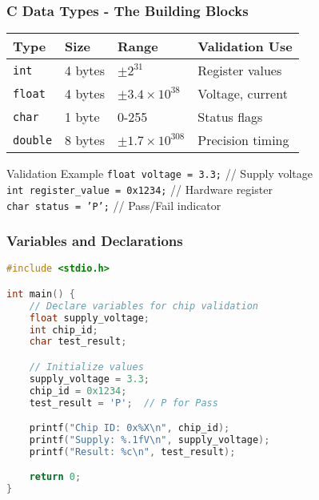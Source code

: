 \documentclass{beamer}
\begin{document}
\begin{frame}
\frametitle{C Data Types - The Building Blocks}
\begin{center}
\begin{tabular}{|l|l|l|l|}
\hline
\textbf{Type} & \textbf{Size} & \textbf{Range} & \textbf{Validation Use} \\
\hline
\texttt{int} & 4 bytes & $\pm 2^{31}$ & Register values \\
\texttt{float} & 4 bytes & $\pm 3.4 \times 10^{38}$ & Voltage, current \\
\texttt{char} & 1 byte & 0-255 & Status flags \\
\texttt{double} & 8 bytes & $\pm 1.7 \times 10^{308}$ & Precision timing \\
\hline
\end{tabular}
\end{center}

\vspace{0.5cm}
\begin{exampleblock}{Validation Example}
\texttt{float voltage = 3.3;} // Supply voltage\\
\texttt{int register\_value = 0x1234;} // Hardware register\\
\texttt{char status = 'P';} // Pass/Fail indicator
\end{exampleblock}
\end{frame}

\begin{frame}[fragile]
\frametitle{Variables and Declarations}
\begin{lstlisting}[language=C, basicstyle=\ttfamily\scriptsize]
#include <stdio.h>

int main() {
    // Declare variables for chip validation
    float supply_voltage;
    int chip_id;
    char test_result;

    // Initialize values
    supply_voltage = 3.3;
    chip_id = 0x1234;
    test_result = 'P';  // P for Pass

    printf("Chip ID: 0x%X\n", chip_id);
    printf("Supply: %.1fV\n", supply_voltage);
    printf("Result: %c\n", test_result);

    return 0;
}
\end{lstlisting}
\end{frame}
\end{document}
